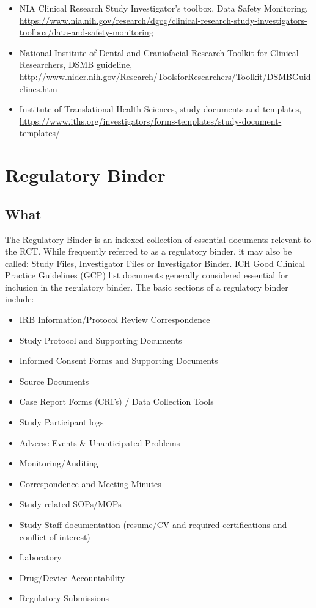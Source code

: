 \documentclass[]{book}
\providecommand{\tightlist}{%
  \setlength{\itemsep}{0pt}\setlength{\parskip}{0pt}}
\theoremstyle{definition}
\theoremstyle{definition}
\theoremstyle{definition}
\theoremstyle{remark}
\begin{document}
\begin{itemize}
\tightlist
\item
  NIA Clinical Research Study Investigator's toolbox, Data Safety
  Monitoring,
  \url{https://www.nia.nih.gov/research/dgcg/clinical-research-study-investigators-toolbox/data-and-safety-monitoring}
\item
  National Institute of Dental and Craniofacial Research Toolkit for
  Clinical Researchers, DSMB guideline,
  \url{http://www.nidcr.nih.gov/Research/ToolsforResearchers/Toolkit/DSMBGuidelines.htm}
\item
  Institute of Translational Health Sciences, study documents and
  templates,
  \url{https://www.iths.org/investigators/forms-templates/study-document-templates/}
\end{itemize}

\section{Regulatory Binder}\label{regulatory-binder}

\subsection{What}\label{what-16}

The Regulatory Binder is an indexed collection of essential documents
relevant to the RCT. While frequently referred to as a regulatory
binder, it may also be called: Study Files, Investigator Files or
Investigator Binder. ICH Good Clinical Practice Guidelines (GCP) list
documents generally considered essential for inclusion in the regulatory
binder. The basic sections of a regulatory binder include:

\begin{itemize}
\tightlist
\item
  IRB Information/Protocol Review Correspondence
\item
  Study Protocol and Supporting Documents
\item
  Informed Consent Forms and Supporting Documents
\item
  Source Documents
\item
  Case Report Forms (CRFs) / Data Collection Tools
\item
  Study Participant logs
\item
  Adverse Events \& Unanticipated Problems
\item
  Monitoring/Auditing
\item
  Correspondence and Meeting Minutes
\item
  Study-related SOPs/MOPs
\item
  Study Staff documentation (resume/CV and required certifications and
  conflict of interest)
\item
  Laboratory
\item
  Drug/Device Accountability
\item
  Regulatory Submissions
\end{itemize}
\end{document}
